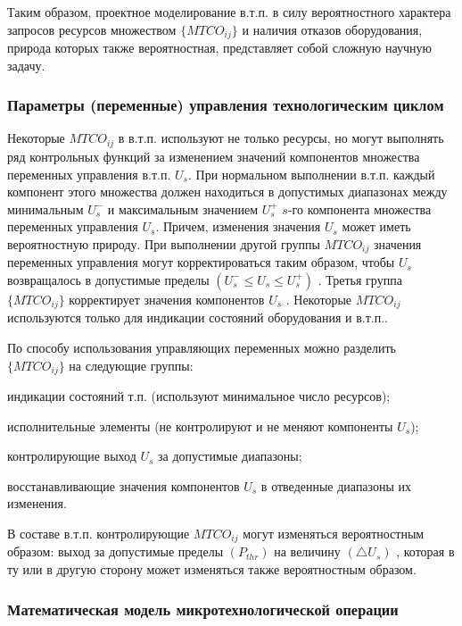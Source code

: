 Таким образом, проектное моделирование в.т.п. в силу  вероятностного характера запросов ресурсов множеством $\big\{MTCO_{ij}\big\}$ и наличия отказов оборудования, природа которых также вероятностная, представляет собой сложную научную задачу.


\subsubsection{Параметры (переменные) управления технологическим циклом}
\label{sec_chapter_enterprise_control_params}


Некоторые $MTCO_{ij}$ в в.т.п. используют не только ресурсы, но могут выполнять ряд контрольных функций за изменением значений компонентов множества переменных управления в.т.п. ${U_s}$. При нормальном выполнении в.т.п. каждый компонент этого множества должен находиться в допустимых диапазонах между минимальным ${U_s^-}$ и максимальным значением ${U_s^+}$ $s$-го компонента множества переменных управления ${U_s}$. Причем, изменения значения $U_s$ может иметь вероятностную природу.
При выполнении другой группы $MTCO_{ij}$ значения переменных управления могут корректироваться таким образом, чтобы $U_s$ возвращалось в допустимые пределы $(U_s^- \leq U_s\leq U_s^+)$ . Третья группа $\big\{MTCO_{ij}\big\}$ корректирует значения компонентов ${U_s}$ . Некоторые $MTCO_{ij}$ используются только для индикации состояний оборудования и в.т.п..

По способу использования управляющих переменных можно разделить $\big\{MTCO_{ij}\big\}$ на следующие группы:

\begin{textitemize}
    \item индикации состояний т.п. (используют минимальное число ресурсов);
    \item исполнительные элементы (не контролируют и не меняют компоненты ${U_s}$);
    \item контролирующие выход $U_s$ за допустимые диапазоны;
    \item восстанавливающие значения компонентов $U_s$ в отведенные диапазоны их изменения.
\end{textitemize}

В составе в.т.п. контролирующие $MTCO_{ij}$ могут изменяться вероятностным образом: выход за допустимые пределы $( P_{thr})$ на величину $( \triangle U_s)$ , которая в ту или в другую сторону может изменяться также вероятностным образом.


\subsubsection{Математическая модель микротехнологической операции}
\label{sec_chapter_enterprise_mtco}

